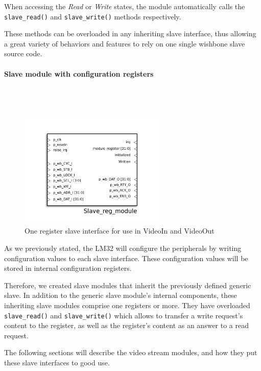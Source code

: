 When accessing the \emph{Read} or \emph{Write} states, the module automatically calls the \texttt{slave\_read()} and \texttt{slave\_write()} methods respectively.

These methods can be overloaded in any inheriting slave interface, thus allowing a great variety of behaviors and features to rely on one single wishbone slave source code.

\paragraph{Slave module with configuration registers}
~\\~

\begin{figure}[H]
\center
\includegraphics[width=7cm]{figs/slave_reg_hdl_symbol.pdf}
\caption{One register slave interface for use in VideoIn and VideoOut}
\label{reg_slave_interface}
\end{figure}



As we previously stated, the LM32 will configure the peripherals by writing configuration values to each slave interface.
These configuration values will be stored in internal configuration registers.

Therefore, we created slave modules that inherit the previously defined generic slave.
In addition to the generic slave module's internal components, these inheriting slave modules comprise one registers or more.
They have overloaded \texttt{slave\_read()} and \texttt{slave\_write()} which allows to transfer a write request's content to the register, as well as the register's content as an answer to a read request.

The following sections will describe the video stream modules, and how they put these slave interfaces to good use.
